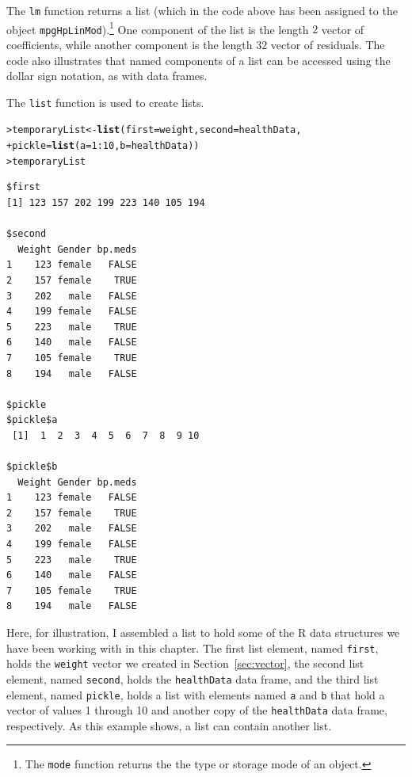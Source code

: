 \documentclass[12pt,oneside]{book}\usepackage[]{graphicx}\usepackage[]{color}
\makeatletter
\newcommand{\hlnum}[1]{\textcolor[rgb]{0.686,0.059,0.569}{#1}}%
\newcommand{\hlopt}[1]{\textcolor[rgb]{0,0,0}{#1}}%
\newcommand{\hlstd}[1]{\textcolor[rgb]{0.345,0.345,0.345}{#1}}%
\newcommand{\hlkwb}[1]{\textcolor[rgb]{0.69,0.353,0.396}{#1}}%
\newcommand{\hlkwc}[1]{\textcolor[rgb]{0.333,0.667,0.333}{#1}}%
\newcommand{\hlkwd}[1]{\textcolor[rgb]{0.737,0.353,0.396}{\textbf{#1}}}%
\newenvironment{kframe}{%
 \def\at@end@of@kframe{}%
 \ifinner\ifhmode%
  \def\at@end@of@kframe{\end{minipage}}%
  \begin{minipage}{\columnwidth}%
 \fi\fi%
 \def\FrameCommand##1{\hskip\@totalleftmargin \hskip-\fboxsep
 \colorbox{shadecolor}{##1}\hskip-\fboxsep
     \hskip-\linewidth \hskip-\@totalleftmargin \hskip\columnwidth}%
 \MakeFramed {\advance\hsize-\width
   \@totalleftmargin\z@ \linewidth\hsize
   \@setminipage}}%
 {\par\unskip\endMakeFramed%
 \at@end@of@kframe}
\newenvironment{knitrout}{}{} %
\makeatother
\begin{document}
The \verb+lm+ function returns a list (which in the code above has been assigned to the object \verb+mpgHpLinMod+).\footnote{The \texttt{mode} function returns the the type or storage mode of an object.} One component of the list is the length $2$ vector of coefficients, while another component is the length $32$ vector of residuals. The code also illustrates that named components of a list can be accessed using the dollar sign notation, as with data frames.

The \verb+list+ function is used to create lists. 
\begin{knitrout}
\color{fgcolor}\begin{kframe}
\begin{alltt}
\hlstd{> }\hlstd{temporaryList} \hlkwb{<-} \hlkwd{list}\hlstd{(}\hlkwc{first}\hlstd{=weight,} \hlkwc{second}\hlstd{=healthData,}
\hlstd{+ }                      \hlkwc{pickle}\hlstd{=}\hlkwd{list}\hlstd{(}\hlkwc{a} \hlstd{=} \hlnum{1}\hlopt{:}\hlnum{10}\hlstd{,} \hlkwc{b}\hlstd{=healthData))}
\hlstd{> }\hlstd{temporaryList}
\end{alltt}
\begin{verbatim}
$first
[1] 123 157 202 199 223 140 105 194

$second
  Weight Gender bp.meds
1    123 female   FALSE
2    157 female    TRUE
3    202   male   FALSE
4    199 female   FALSE
5    223   male    TRUE
6    140   male   FALSE
7    105 female    TRUE
8    194   male   FALSE

$pickle
$pickle$a
 [1]  1  2  3  4  5  6  7  8  9 10

$pickle$b
  Weight Gender bp.meds
1    123 female   FALSE
2    157 female    TRUE
3    202   male   FALSE
4    199 female   FALSE
5    223   male    TRUE
6    140   male   FALSE
7    105 female    TRUE
8    194   male   FALSE
\end{verbatim}
\end{kframe}
\end{knitrout}
Here, for illustration, I assembled a list to hold some of the R data structures we have been working with in this chapter. The first list element, named \verb+first+, holds the \verb+weight+ vector we created in Section~\ref{sec:vector}, the second list element, named \verb+second+, holds the \verb+healthData+ data frame, and the third list element, named \verb+pickle+, holds a list with elements named \verb+a+ and \verb+b+ that hold a vector of values 1 through 10 and another copy of the \verb+healthData+ data frame, respectively. As this example shows, a list can contain another list. 
\end{document}

